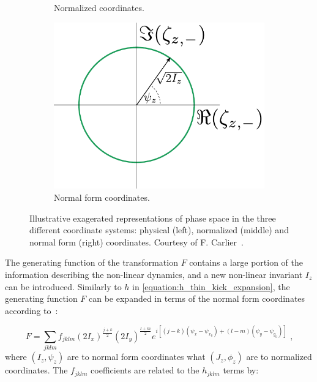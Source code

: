 \begin{figure}[!hbt]
\begin{subfigure}[b]{0.30\textwidth}
        \caption{Normalized coordinates.}
        \label{fig:phase_space_normalized_non-linear}
    \end{subfigure}
    \hfill
    \begin{subfigure}[b]{0.3805\textwidth}
        \centering
        \includegraphics[width=\textwidth]{Figures/Beam_Dynamics_Theory/phase_space_nonlinear_normal_form.pdf}
        \caption{Normal form coordinates.}
        \label{fig:phase_space_normal_form_non-linear}
    \end{subfigure}
    \caption{Illustrative exagerated representations of phase space in the three different coordinate systems: physical (left), normalized (middle) and normal form (right) coordinates. Courtesy of F. Carlier~\cite{PHD:Carlier}.}
    \label{figure:phase_space_non-linear_physical_normalized_normal_form_coordinates}
\end{figure}

The generating function of the transformation \(F\) contains a large portion of the information describing the non-linear dynamics, and a new non-linear invariant \(I_z\) can be introduced. 
Similarly to \(h\) in \cref{equation:h_thin_kick_expansion}, the generating function \(F\) can be expanded in terms of the normal form coordinates according to~\cite{PHD:Franchi}:

\begin{equation}
    F = \sum_{jklm} f_{jklm} \left( 2 I_x \right)^{\frac{j+k}{2}} \left(2 I_y \right)^{\frac{l+m}{2}} e^{i \left[ (j-k) \left( \psi_x - \psi_{x_0} \right) + (l-m) \left( \psi_y - \psi_{y_0} \right) \right]} \text{ ,}
    \label{equation:generating_function_expansion}
\end{equation}
where \((I_z, \psi_z)\) are to normal form coordinates what \((J_z, \phi_z)\) are to normalized coordinates.
The \(f_{jklm}\) coefficients are related to the \(h_{jklm}\) terms by:


